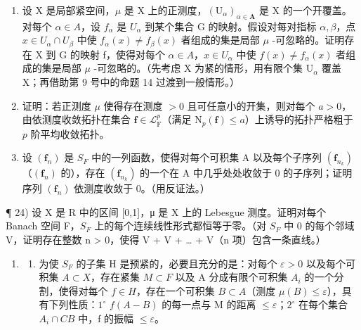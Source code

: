 \begin{enumerate}
\def\labelenumi{\arabic{enumi})}
\setcounter{enumi}{20}
\item
  设 X 是局部紧空间，\(\mu\) 是 X 上的正测度，\((\mathrm{U}_{\alpha})_{\alpha\in\mathbf{A}}\) 是 X 的一个开覆盖。对每个 \(\alpha\in A\)，设 \(f_{\alpha}\) 是 \(U_{\alpha}\) 到某个集合 G 的映射。假设对每对指标 \(\alpha,\beta\)，点 \(x\in U_{\alpha}\cap U_{\beta}\) 中使 \(f_{\alpha}(x)\neq f_{\beta}(x)\) 者组成的集是局部 \(\mu\) -可忽略的。证明存在 X 到 G 的映射 f，使得对每个 \(\alpha\in A\)，\(x\in U_{\alpha}\) 中使 \(f(x)\neq f_{\alpha}(x)\) 者组成的集是局部 \(\mu\) -可忽略的。（先考虑 X 为紧的情形，用有限个集 \(\mathrm{U}_{\alpha}\) 覆盖 X；再借助第 9 号中的命题 14 过渡到一般情形。）
\item
  证明：若正测度 \(\mu\) 使得存在测度 \(>0\) 且可任意小的开集，则对每个 \(a > 0\)，由依测度收敛拓扑在集合 \(\mathbf{f} \in \mathcal{L}_{\mathrm{F}}^{p}\)（满足 \(\mathrm{N}_p(\mathbf{f}) \leqslant a\)）上诱导的拓扑严格粗于 \(p\) 阶平均收敛拓扑。
\item
  设 \((\mathbf{f}_{n})\) 是 \(S_{F}\) 中的一列函数，使得对每个可积集 A 以及每个子序列 \((\mathbf{f}_{n_{k}})\)（\((\mathbf{f}_{n})\) 的），存在 \((\mathbf{f}_{n_{k}})\) 的一个在 A 中几乎处处收敛于 0 的子序列；证明序列 \((\mathbf{f}_{n})\) 依测度收敛于 0。（用反证法。）
\end{enumerate}

¶ 24) 设 X 是 R 中的区间 {[}0,1{]}，μ 是 X 上的 Lebesgue 测度。证明对每个 Banach 空间 F，\(S_F\) 上的每个连续线性形式都恒等于零。（对 \(S_F\) 中 0 的每个邻域 V，证明存在整数 n \textgreater{} 0，使得 V + V + \ldots{} + V（n 项）包含一条直线。）

\begin{enumerate}
\def\labelenumi{\arabic{enumi})}
\setcounter{enumi}{24}
\tightlist
\item
  \begin{enumerate}
  \def\labelenumii{\alph{enumii})}
  \tightlist
  \item
    为使 \(S_{F}\) 的子集 H 是预紧的，必要且充分的是：对每个 \(\varepsilon > 0\) 以及每个可积集 \(A \subset X\)，存在紧集 \(M \subset F\) 以及 A 分成有限个可积集 \(A_{i}\) 的一个分割，使得对每个 \(f \in H\)，存在一个可积集 \(B \subset A\)（测度 \(\mu(B) \leqslant \varepsilon\)），具有下列性质：\(1^{\circ}\) \(f(A - B)\) 的每一点与 M 的距离 \(\leqslant \varepsilon\)；\(2^{\circ}\) 在每个集合 \(A_{i} \cap C B\) 中，f 的振幅 \(\leqslant \varepsilon\)。
  \end{enumerate}
\end{enumerate}


